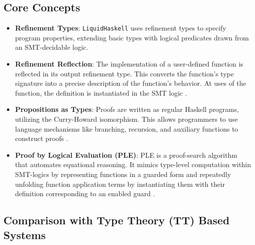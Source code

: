 \documentclass[]{rptuseminar}
\begin{document}
\subsection*{Core Concepts}

\begin{itemize}
  \item \textbf{Refinement Types}: \texttt{LiquidHaskell} uses refinement types to specify program properties, 
        extending basic types with logical predicates drawn from an SMT-decidable logic.
    \item \textbf{Refinement Reflection}: The implementation of a user-defined function is reflected in
      its output refinement type. This converts the function's type signature into a precise description of the function's behavior. 
      At uses of the function, the definition is instantiated in the SMT logic \cite{vazou_refinement_2018}.
   \item \textbf{Propositions as Types}: Proofs are written as regular Haskell programs, 
     utilizing the Curry-Howard isomorphism. This allows programmers to use language mechanisms 
     like branching, recursion, and auxiliary functions to construct proofs \cite{vazou_refinement_2018}.
   \item \textbf{Proof by Logical Evaluation (PLE)}: PLE is a proof-search algorithm that automates 
     equational reasoning. It mimics type-level computation within SMT-logics by representing 
     functions in a guarded form and repeatedly unfolding function application terms by instantiating them 
     with their definition corresponding to an enabled guard \cite{vazou_refinement_2018}.
\end{itemize}

\subsection*{Comparison with Type Theory (TT) Based Systems}
\end{document}
